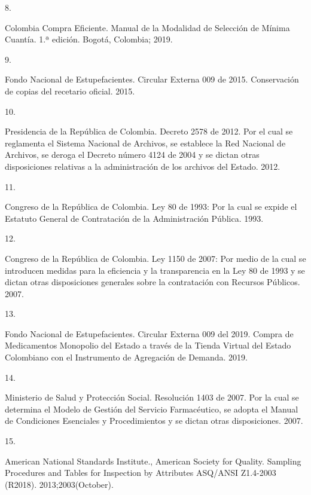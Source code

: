 \documentclass[
]{book}
\newlength{\cslhangindent}
\newlength{\csllabelwidth}
\newlength{\cslentryspacingunit} %
\newenvironment{CSLReferences}[2] %
 {%
  \setlength{\parindent}{0pt}
  \ifodd #1
  \let\oldpar\par
  \def\par{\hangindent=\cslhangindent\oldpar}
  \fi
  \setlength{\parskip}{#2\cslentryspacingunit}
 }%
 {}
\newcommand{\CSLLeftMargin}[1]{\parbox[t]{\csllabelwidth}{#1}}
\newcommand{\CSLRightInline}[1]{\parbox[t]{\linewidth - \csllabelwidth}{#1}\break}
\begin{document}
\begin{CSLReferences}{0}{0}
\leavevmode{}%
\CSLLeftMargin{8. }
\CSLRightInline{Colombia Compra Eficiente. {Manual de la Modalidad de Selecci{ó}n de M{í}nima Cuant{í}a}. 1.ª edición. Bogot{á}, Colombia; 2019.}

\leavevmode{}%
\CSLLeftMargin{9. }
\CSLRightInline{Fondo Nacional de Estupefacientes. {Circular Externa 009 de 2015. Conservaci{ó}n de copias del recetario oficial.} 2015.}

\leavevmode{}%
\CSLLeftMargin{10. }
\CSLRightInline{Presidencia de la República de Colombia. {Decreto 2578 de 2012. Por el cual se reglamenta el Sistema Nacional de Archivos, se establece la Red Nacional de Archivos, se deroga el Decreto n{ú}mero 4124 de 2004 y se dictan otras disposiciones relativas a la administraci{ó}n de los archivos del Estado.} 2012.}

\leavevmode{}%
\CSLLeftMargin{11. }
\CSLRightInline{Congreso de la República de Colombia. {Ley 80 de 1993: Por la cual se expide el Estatuto General de Contrataci{ó}n de la Administraci{ó}n P{ú}blica}. 1993.}

\leavevmode{}%
\CSLLeftMargin{12. }
\CSLRightInline{Congreso de la República de Colombia. {Ley 1150 de 2007: Por medio de la cual se introducen medidas para la eficiencia y la transparencia en la Ley 80 de 1993 y se dictan otras disposiciones generales sobre la contrataci{ó}n con Recursos P{ú}blicos.} 2007.}

\leavevmode{}%
\CSLLeftMargin{13. }
\CSLRightInline{Fondo Nacional de Estupefacientes. {Circular Externa 009 del 2019. Compra de Medicamentos Monopolio del Estado a trav{é}s de la Tienda Virtual del Estado Colombiano con el Instrumento de Agregaci{ó}n de Demanda}. 2019.}

\leavevmode{}%
\CSLLeftMargin{14. }
\CSLRightInline{Ministerio de Salud y Protección Social. {Resoluci{ó}n 1403 de 2007. Por la cual se determina el Modelo de Gesti{ó}n del Servicio Farmac{é}utico, se adopta el Manual de Condiciones Esenciales y Procedimientos y se dictan otras disposiciones}. 2007.}

\leavevmode{}%
\CSLLeftMargin{15. }
\CSLRightInline{American National Standards Institute., American Society for Quality. {Sampling Procedures and Tables for Inspection by Attributes ASQ/ANSI Z1.4-2003 (R2018)}. 2013;2003(October).}


\end{CSLReferences}
\end{document}
